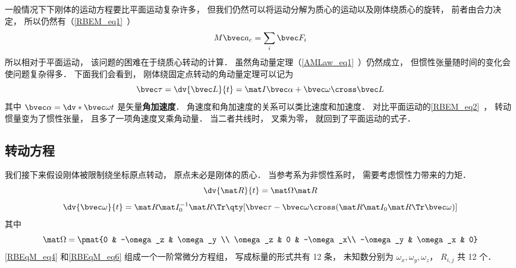 

一般情况下下刚体的运动方程要比平面运动复杂许多， 但我们仍然可以将运动分解为质心的运动以及刚体绕质心的旋转， 前者由合力决定， 所以仍然有（\autoref{RBEM_eq1}~）
\begin{equation}\label{RBEqM_eq8}
M\bvec a_c = \sum_i \bvec F_i
\end{equation}
所以相对于平面运动， 该问题的困难在于绕质心转动的计算． 虽然角动量定理（\autoref{AMLaw_eq1}~）仍然成立， 但惯性张量随时间的变化会使问题复杂得多． 下面我们会看到， 刚体绕固定点转动的角动量定理可以记为
\begin{equation}
\bvec\tau = \dv{\bvec L}{t} = \mat I \bvec\alpha + \bvec\omega \cross \bvec L
\end{equation}
其中 $\bvec\alpha = \dv*{\bvec\omega}{t}$ 是矢量\textbf{角加速度}． 角速度和角加速度的关系可以类比速度和加速度． 对比平面运动的\autoref{RBEM_eq2}~， 转动惯量变为了惯性张量， 且多了一项角速度叉乘角动量． 当二者共线时， 叉乘为零， 就回到了平面运动的式子．

\subsection{转动方程}
我们接下来假设刚体被限制绕坐标原点转动， 原点未必是刚体的质心． 当参考系为非惯性系时， 需要考虑惯性力带来的力矩． 
\begin{equation}\label{RBEqM_eq4}
\dv{\mat R}{t} = \mat\Omega \mat R
\end{equation}
\begin{equation}\label{RBEqM_eq6}
\dv{\bvec \omega}{t} = \mat R \mat I_0^{-1} \mat R\Tr \qty[\bvec \tau  - \bvec\omega\cross(\mat R \mat I_0 \mat R\Tr \bvec\omega)]
\end{equation}
其中
\begin{equation}\label{RBEqM_eq5}
\mat\Omega = \pmat{0 & -\omega_z & \omega_y \\ \omega_z & 0 & -\omega_x\\ -\omega_y & \omega_x & 0}
\end{equation}
\autoref{RBEqM_eq4} 和\autoref{RBEqM_eq6} 组成一个一阶常微分方程组， 写成标量的形式共有 12 条， 未知数分别为 $\omega_x, \omega_y, \omega_z$， $R_{i,j}$ 共 12 个．

